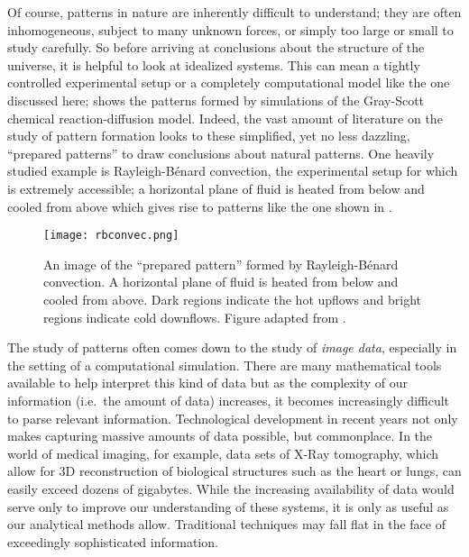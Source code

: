 	Of course, patterns in nature are inherently difficult to understand; they are often inhomogeneous, subject to many unknown forces, or simply too large or small to study carefully. So before arriving at conclusions about the structure of the universe, it is helpful to look at idealized systems. This can mean a tightly controlled experimental setup or a completely computational model like the one discussed here;  shows the patterns formed by simulations of the Gray-Scott chemical reaction-diffusion model. Indeed, the vast amount of literature on the study of pattern formation looks to these simplified, yet no less dazzling, ``prepared patterns'' to draw conclusions about natural patterns. One heavily studied example is Rayleigh-B\'{e}nard convection, the experimental setup for which is extremely accessible; a horizontal plane of fluid is heated from below and cooled from above which gives rise to patterns like the one shown in .
%
\begin{figure}[h]
	\centering
	\texttt{[image: rbconvec.png]}
	\caption{An image of the ``prepared pattern'' formed by Rayleigh-B\'{e}nard convection. A horizontal plane of fluid is heated from below and cooled from above. Dark regions indicate the hot upflows and bright regions indicate cold downflows. Figure adapted from \protect{}.}
	\label{fig:rbconvec}
\end{figure}
%

	The study of patterns often comes down to the study of \textit{image data}, especially in the setting of a computational simulation. There are many mathematical tools available to help interpret this kind of data but as the complexity of our information (i.e.\ the amount of data) increases, it becomes increasingly difficult to parse relevant information.  Technological development in recent years not only makes capturing massive amounts of data possible, but commonplace. In the world of medical imaging, for example, data sets of X-Ray tomography, which allow for 3D reconstruction of biological structures such as the heart or lungs, can easily exceed dozens of gigabytes. While the increasing availability of data would serve only to improve our understanding of these systems, it is only as useful as our analytical methods allow. Traditional techniques may fall flat in the face of exceedingly sophisticated information.
	
